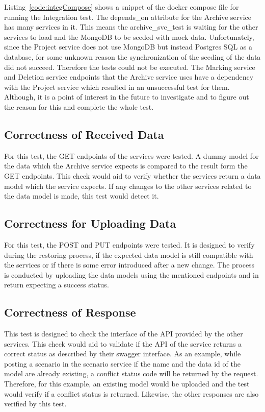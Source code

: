 Listing~\ref{code:integCompose} shows a snippet of the docker compose file for running the Integration test. The depends\_on attribute for the Archive service
has many services in it. This means the archive\_svc\_test is waiting for the other services to load and the MongoDB to be seeded with mock data. Unfortunately,
since the Project service does not use MongoDB but instead Postgres SQL as a database, for some unknown reason the synchronization of the seeding of the data
did not succeed. Therefore the tests could not be executed. The
Marking service and Deletion service endpoints that the Archive service uses have a dependency with the Project service which resulted in an unsuccessful test
for them. Although, it is a point of interest in the future to investigate and to figure out the reason for this and complete the whole test.

\subsection{Correctness of Received Data}
For this test, the GET endpoints of the services were tested. A dummy model for the data which the Archive service expects is compared to the result
form the GET endpoints. This check would aid to verify whether the services return a data model which the service expects. If any changes to the other services
related to the data model is made, this test would detect it. 

\subsection{Correctness for Uploading Data}
For this test, the POST and PUT endpoints were tested. It is designed to verify during the restoring process, if the expected data model 
is still compatible with the services or if there is some error introduced after a new change. The process is conducted by uploading the 
data models using the mentioned endpoints and in return expecting a success status.

\subsection{Correctness of Response}
This test is designed to check the interface of the API provided by the other services. This check would aid to validate if the API of the
service returns a correct status as described by their swagger interface. As an example, while posting a scenario in the scenario service if the
name and the data id of the model are already existing, a conflict status code will be returned by the request. Therefore, for this example, an existing
model would be uploaded and the test would verify if a conflict status is returned. Likewise, the other responses are also verified by this test. 

